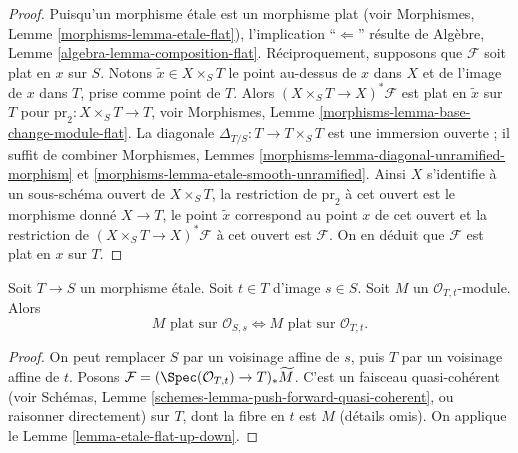 \begin{proof}
Puisqu'un morphisme \'etale est un morphisme plat (voir
Morphismes, Lemme \ref{morphisms-lemma-etale-flat}),
l'implication ``$\Leftarrow$'' résulte de
Algèbre, Lemme \ref{algebra-lemma-composition-flat}.
Réciproquement, supposons que $\mathcal{F}$ soit plat en $x$ sur $S$.
Notons $\tilde x \in X \times_S T$ le point au-dessus de $x$ dans $X$
et de l'image de $x$ dans $T$, prise comme point de $T$.
Alors $(X \times_S T \to X)^*\mathcal{F}$ est plat en $\tilde x$ sur $T$
pour $\text{pr}_2 : X \times_S T \to T$, voir
Morphismes, Lemme \ref{morphisms-lemma-base-change-module-flat}.
La diagonale $\Delta_{T/S} : T \to T \times_S T$ est une immersion ouverte ;
il suffit de combiner
Morphismes, Lemmes \ref{morphisms-lemma-diagonal-unramified-morphism} et
\ref{morphisms-lemma-etale-smooth-unramified}.
Ainsi $X$ s'identifie à un sous-schéma ouvert de $X \times_S T$,
la restriction de $\text{pr}_2$ à cet ouvert est le morphisme donné $X \to T$,
le point $\tilde x$ correspond au point $x$ de cet ouvert et
la restriction de $(X \times_S T \to X)^*\mathcal{F}$ à cet ouvert est $\mathcal{F}$.
On en déduit que $\mathcal{F}$ est plat en $x$ sur $T$.
\end{proof}

\begin{lemma}
\label{lemma-etale-flat-up-down-local-ring}
Soit $T \to S$ un morphisme \'etale. Soit $t \in T$ d'image $s \in S$.
Soit $M$ un $\mathcal{O}_{T, t}$-module. Alors
$$
M\text{ plat sur }\mathcal{O}_{S, s}
\Leftrightarrow
M\text{ plat sur }\mathcal{O}_{T, t}.
$$
\end{lemma}

\begin{proof}
On peut remplacer $S$ par un voisinage affine de $s$, puis
$T$ par un voisinage affine de $t$.
Posons $\mathcal{F} = (\Spec(\mathcal{O}_{T, t}) \to T)_*\widetilde M$.
C'est un faisceau quasi-cohérent (voir
Schémas, Lemme \ref{schemes-lemma-push-forward-quasi-coherent},
ou raisonner directement)
sur $T$, dont la fibre en $t$ est $M$ (détails omis).
On applique
le Lemme \ref{lemma-etale-flat-up-down}.
\end{proof}

